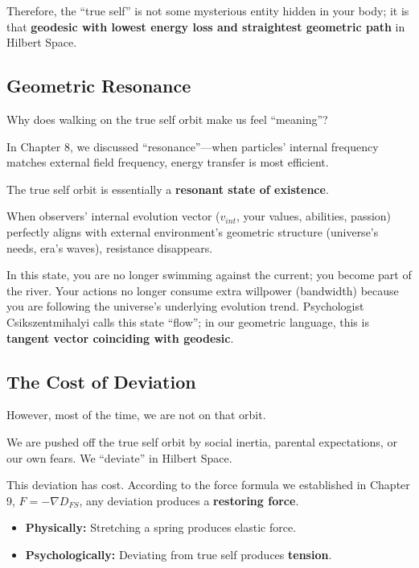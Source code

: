 \documentclass[11pt,a4paper,twoside]{book}
\begin{document}
Therefore, the ``true self'' is not some mysterious entity hidden in your body; it is that \textbf{geodesic with lowest energy loss and straightest geometric path} in Hilbert Space.

\subsection{Geometric Resonance}

Why does walking on the true self orbit make us feel ``meaning''?

In Chapter 8, we discussed ``resonance''---when particles' internal frequency matches external field frequency, energy transfer is most efficient.

The true self orbit is essentially a \textbf{resonant state of existence}.

When observers' internal evolution vector ($v_{int}$, your values, abilities, passion) perfectly aligns with external environment's geometric structure (universe's needs, era's waves), resistance disappears.

In this state, you are no longer swimming against the current; you become part of the river. Your actions no longer consume extra willpower (bandwidth) because you are following the universe's underlying evolution trend. Psychologist Csikszentmihalyi calls this state ``flow''; in our geometric language, this is \textbf{tangent vector coinciding with geodesic}.

\subsection{The Cost of Deviation}

However, most of the time, we are not on that orbit.

We are pushed off the true self orbit by social inertia, parental expectations, or our own fears. We ``deviate'' in Hilbert Space.

This deviation has cost. According to the force formula we established in Chapter 9, $F = -\nabla D_{FS}$, any deviation produces a \textbf{restoring force}.

\begin{itemize}
\item \textbf{Physically:} Stretching a spring produces elastic force.

\item \textbf{Psychologically:} Deviating from true self produces \textbf{tension}.
\end{itemize}
\end{document}
